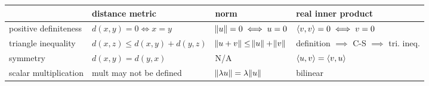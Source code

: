 \begin{enumerate}
\begin{tabular}{l|l|l|l}
 & distance metric & norm & real inner product\\
\hline
positive definiteness & $d(x, y) = 0 \iff x = y$ & $\norm{u} = 0 \iff u = 0$ & $\langle v, v\rangle = 0 \iff v = 0$\\
triangle inequality & $d(x, z) \leq d(x, y) + d(y, z)$ & $\norm{u + v} \leq \norm{u} + \norm{v}$ & definition $\implies$  C-S $\implies$  tri. ineq.\\
symmetry & $d(x, y) = d(y, x)$ & N/A & $\langle u, v\rangle = \langle v, u\rangle$\\
scalar multiplication & mult may not be defined & $\norm{\lambda u} = \lambda \norm{u}$ & bilinear\\
\end{tabular}


\end{enumerate}
